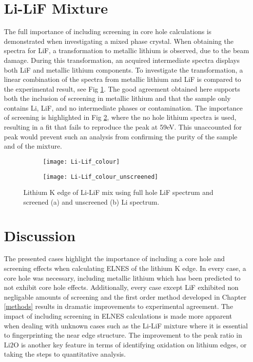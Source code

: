 \section{Li-LiF Mixture}
The full importance of including screening in core hole calculations is demonstrated when investigating a mixed phase crystal.  When obtaining the spectra for LiF, a transformation to metallic lithium is observed, due to the beam damage.   During this transformation, an acquired intermediate spectra displays both LiF and metallic lithium components.  To investigate the transformation, a linear combination of the spectra from metallic lithium and LiF is compared to the experimental result, see Fig \ref{mix-screened}.  The good agreement obtained here supports both the inclusion of screening in metallic lithium and that the sample only contains   Li, LiF, and no intermediate phases or contamination.  The importance of screening is highlighted in Fig \ref{mix-unscreened}, where the no hole lithium spectra is used, resulting in a  fit that fails to reproduce the peak at 59eV.  This unaccounted for peak would prevent such an  analysis from confirming the purity of the sample and of the mixture.  



\begin{figure}
	\centering
	\begin{subfigure}{0.45\textwidth}
		
		\texttt{[image: Li-Lif\_colour]}
		\caption{}
		\label{mix-screened}
	\end{subfigure}
\hspace{-0.01cm}
	\begin{subfigure}{0.45\textwidth}
		\texttt{[image: Li-Lif\_colour\_unscreened]}
		\caption{}
		\label{mix-unscreened}
	\end{subfigure}
	\caption{Lithium K edge of Li-LiF mix using full hole LiF spectrum and screened (a) and unscreened (b) Li spectrum. }

\label{Li-LiF_mix_screened}
\end{figure}



\section{Discussion}
The presented cases highlight the importance of including a core hole and screening effects when calculating ELNES of the lithium K edge.  In every case, a core hole was necessary, including metallic lithium which has been predicted to not exhibit core hole effects.  Additionally, every case except LiF exhibited non negligable amounts of screening  and the first order method developed in Chapter \ref{methods} results in dramatic improvements to experimental agreement.  The impact of including screening in ELNES calculations is made more apparent when dealing with unknown cases such as the Li-LiF mixture where it is essential to fingerprinting the near edge structure.  The improvement to the peak ratio in $ \mathrm{Li2O} $ is another key feature in terms of identifying oxidation on lithium edges, or taking the steps to quantitative analysis.  \\

